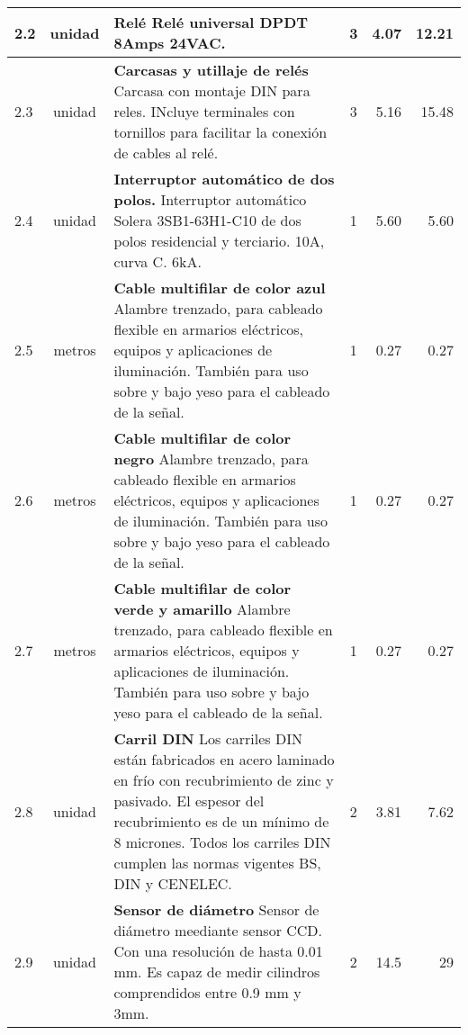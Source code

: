 \begin{longtable}{l c p{7cm} c r r}
    2.2 & unidad & \textbf{Relé} Relé universal DPDT 8Amps 24VAC. & 3 & 4.07 & 12.21 \\ \hline
    
    2.3 & unidad & \textbf{Carcasas y utillaje de relés} Carcasa con montaje DIN para reles. INcluye terminales con tornillos para facilitar la conexión de cables al relé. & 3 &  5.16 & 15.48 \\ \hline
    
    2.4 & unidad & \textbf{Interruptor automático de dos polos.} \newline \small Interruptor automático Solera 3SB1-63H1-C10 de dos polos residencial y terciario. 10A, curva C. 6kA. & 1 & 5.60  & 5.60 \\ \hline

    2.5 & metros & \textbf{Cable multifilar de color azul} \newline \small Alambre trenzado, para cableado flexible en armarios eléctricos, equipos y aplicaciones de iluminación. También para uso sobre y bajo yeso para el cableado de la señal. \newline \small & 1 & 0.27 & 0.27 \\ \hline

    2.6 & metros & \textbf{Cable multifilar de color negro} \newline \small Alambre trenzado, para cableado flexible en armarios eléctricos, equipos y aplicaciones de iluminación. También para uso sobre y bajo yeso para el cableado de la señal. \newline \small & 1 & 0.27 & 0.27 \\ \hline
   
    2.7 & metros & \textbf{Cable multifilar de color verde y amarillo} \newline \small Alambre trenzado, para cableado flexible en armarios eléctricos, equipos y aplicaciones de iluminación. También para uso sobre y bajo yeso para el cableado de la señal. \newline \small & 1 & 0.27 & 0.27 \\ \hline

    2.8 & unidad & \textbf{Carril DIN} \newline \small Los carriles DIN están fabricados en acero laminado en frío con recubrimiento de zinc y pasivado. El espesor del recubrimiento es de un mínimo de 8 micrones. Todos los carriles DIN cumplen las normas vigentes BS, DIN y CENELEC. & 2 & 3.81  &  7.62\\ \hline

    2.9 & unidad & \textbf{Sensor de diámetro} \newline \small Sensor de diámetro meediante sensor CCD. Con una resolución de hasta 0.01 mm. Es capaz de medir cilindros comprendidos entre 0.9 mm y 3mm. & 2 & 14.5 & 29\\ \hline
    

\end{longtable}
